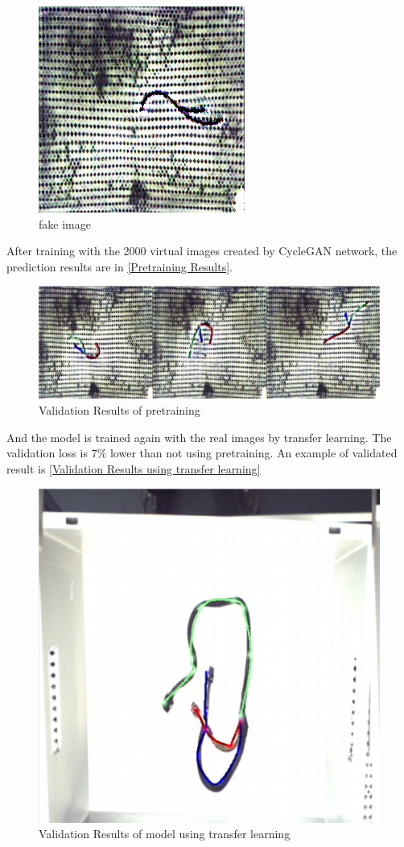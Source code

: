	\begin{figure}
		\centering
		\includegraphics[width=0.6\linewidth]{example_images/CycleGAN_fakeimage}
		\caption{fake image}
		\label{fig:fakeimage}
	\end{figure}
	After training with the 2000 virtual images created by CycleGAN network, the prediction results are in \autoref{Pretraining Results}.
	\begin{figure}
		\centering
		\includegraphics[width=0.6\linewidth]{example_images/PretrainingResultCycleGAN}
		\caption{Validation Results of pretraining}
		\label{Pretraining Results}
	\end{figure}
	And the model is trained again with the real images by transfer learning. The validation loss is $7\%$ lower than not using pretraining. An example of validated result is 
	\autoref{Validation Results using transfer learning}
	\begin{figure}
		\centering
		\includegraphics[width=0.6\linewidth]{example_images/usePretraining_NoTransformer}
		\caption{Validation Results of model using transfer learning}
		\label{Validation Results using transfer learning}
	\end{figure}


